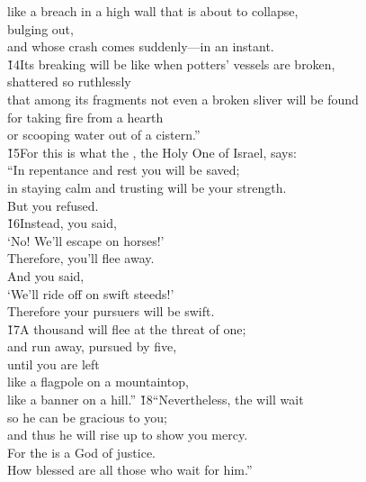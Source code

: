 \begin{poetry}
\poemll    like a breach in a high wall that is about to collapse, \\
\poemlll       bulging out, \\
\poemll    and whose crash comes suddenly---in an instant. \\
\poeml \v{14}Its breaking will be like when potters' vessels are broken, \\
\poemll    shattered so ruthlessly \\
\poeml that among its fragments not even a broken sliver will be found \\
\poemll    for taking fire from a hearth \\
\poemlll       or scooping water out of a cistern.'' \\
\poeml \v{15}For this is what the  , the Holy One of Israel, says: \\
\poeml ``In repentance and rest you will be saved; \\
\poemll    in staying calm and trusting will be your strength. \\
\poemlll       But you refused. \\
\poeml \v{16}Instead, you said, \\
\poemll    `No! We'll escape on horses!' \\
\poemlll       Therefore, you'll flee away. \\
\poeml And you said, \\
\poemll    `We'll ride off on swift steeds!' \\
\poemlll       Therefore your pursuers will be swift. \\
\poeml \v{17}A thousand will flee at the threat of one; \\
\poemll    and run away, pursued by five, \\
\poeml until you are left \\
\poemll    like a flagpole on a mountaintop, \\
\poemlll       like a banner on a hill.''
\poeml \v{18}``Nevertheless, the  will wait \\
\poemll    so he can be gracious to you; \\
\poemlll       and thus he will rise up to show you mercy. \\
\poeml For the  is a God of justice. \\
\poemll    How blessed are all those who wait for him.''
\end{poetry}

